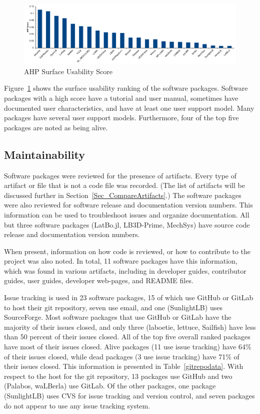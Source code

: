 \documentclass[final, 3p, times, authoryear]{elsarticle}
\begin{document}
\begin{figure}[h!]
	\begin{center}
		\includegraphics[width=1.0\textwidth]{./figures/usability_chart.pdf}
		\caption{AHP Surface Usability Score}
		\label{Fig_Usability}
	\end{center}
\end{figure}

Figure~\ref{Fig_Usability} shows the surface usability ranking of the software
packages. Software packages with a high score have a tutorial and user manual,
sometimes have documented user characteristics, and have at least one user
support model. Many packages have several user support models. Furthermore, four
of the top five packages are noted as being alive. 

\subsection{Maintainability} \label{Sec_Maintainability}

Software packages were reviewed for the presence of artifacts. Every type of
artifact or file that is not a code file was recorded. (The list of artifacts
will be discussed further in Section~\ref{Sec_CompareArtifacts}.)  The software
packages were also reviewed for software release and documentation version
numbers. This information can be used to troubleshoot issues and organize
documentation. All but three software packages (LatBo.jl, LB3D-Prime, MechSys)
have source code release and documentation version numbers.

When present, information on how code is reviewed, or how to contribute to the
project was also noted. In total, 11 software packages have this information,
which was found in various artifacts, including in developer guides, contributor
guides, user guides, developer web-pages, and README files. 

Issue tracking is used in 23 software packages, 15 of which use GitHub or GitLab
to host their git repository, seven use email, and one (SunlightLB) uses
SourceForge. Most software packages that use GitHub or GitLab have the majority of their issues closed, and only three (laboetie, lettuce, Sailfish) have less than 50 percent of their issues closed. All of the top five overall ranked packages have most of their issues closed. Alive packages (11 use issue tracking) have 64\% of their issues closed, while dead packages (3 use issue tracking) have 71\% of their issues closed. This information is presented in
Table~\ref{gitrepodata}. With respect to the host for the git repository, 13
packages use GitHub and two (Palabos, waLBerla) use GitLab. Of the other
packages, one package (SunlightLB) uses CVS for issue tracking and version
control, and seven packages do not appear to use any issue tracking system.
\end{document}
